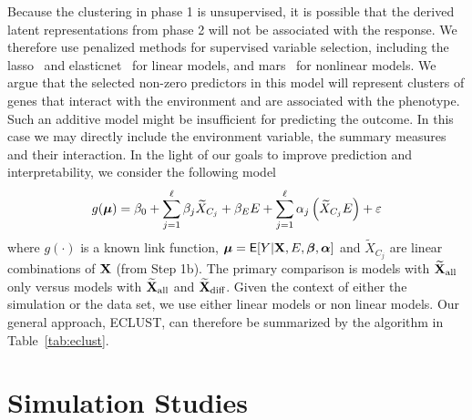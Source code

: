 Because the clustering in phase 1 is unsupervised, it is possible that the derived latent representations from phase 2 will not be associated with the response. We therefore use penalized methods for supervised variable selection, including the lasso~\citep{tibshirani1996regression} and elasticnet~\citep{zou2005regularization} for linear models, and \ac{mars}~\citep{friedman1991multivariate} for nonlinear models. We argue that the selected non-zero predictors in this model will represent clusters of genes that interact with the environment and are associated with the phenotype. Such an additive model might be insufficient for predicting the outcome. In this case we may directly include the environment variable, the summary measures and their interaction. In the light of our goals to improve prediction and interpretability, we consider the following model
\begin{equation}  
g(\boldsymbol{\mu}) = \beta_0 + \sum_{j=1}^{\ell} \beta_j \widetilde{X}_{C_j} + \beta_E E + 
\sum_{j=1}^{\ell} \alpha_j \left(\widetilde{X}_{C_j} E \right) + \varepsilon
\label{eq:linpred1.1}
\end{equation}
where $g(\cdot)$ is a known link function, $\boldsymbol{\mu} = \mathsf{E}[Y|\mathbf{X},E,\boldsymbol{\beta}, \boldsymbol{\alpha}]$ and   $\widetilde{X}_{C_j}$ are linear combinations of $\mathbf{X}$ (from Step 1b). The primary comparison is models with $\widetilde{\mathbf{X}}_{\textrm{{all}}}$ only versus models with $\widetilde{\mathbf{X}}_{\textrm{{all}}}$ and $\widetilde{\mathbf{X}}_{\textrm{{diff}}}$. Given the context of either the simulation or the data set, we use either linear models or non linear models. Our general approach, ECLUST, can therefore be summarized by the algorithm in Table~\ref{tab:eclust}. 




\section{Simulation Studies}


